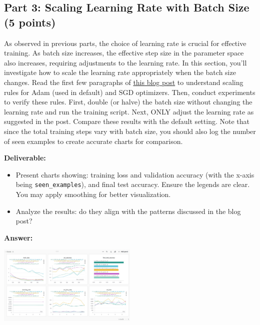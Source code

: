 \documentclass[11pt, oneside]{article}   	%
\begin{document}
\subsection*{Part 3: Scaling Learning Rate with Batch Size (5 points)}

As observed in previous parts, the choice of learning rate is crucial for effective training. As batch size increases, the effective step size in the parameter space also increases, requiring adjustments to the learning rate. In this section, you'll investigate how to scale the learning rate appropriately when the batch size changes. Read the first few paragraphs of \href{https://www.cs.princeton.edu/~smalladi/blog/2024/01/22/SDEs-ScalingRules/}{this blog post} to understand scaling rules for Adam (used in default) and SGD optimizers. Then, conduct experiments to verify these rules. First, double (or halve) the batch size without changing the learning rate and run the training script. Next, ONLY adjust the learning rate as suggested in the post. Compare these results with the default setting. Note that since the total training steps vary with batch size, you should also log the number of seen examples to create accurate charts for comparison.

\noindent\textbf{Deliverable:}
\begin{itemize}
    \item Present charts showing: training loss and validation accuracy (with the x-axis being \texttt{seen\_examples}), and final test accuracy. Ensure the legends are clear. You may apply smoothing for better visualization. 
    \item Analyze the results: do they align with the patterns discussed in the blog post?
\end{itemize}

\textbf{Answer:} \\
\begin{center}
    \includegraphics[width=0.5\textwidth]{report_pic/LearningRateBatch.png}
\end{center}
\end{document}
